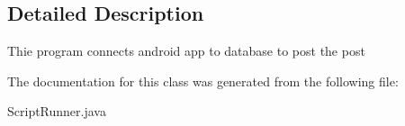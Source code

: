 \subsection{Detailed Description}
Thie program connects android app to database to post the post 

The documentation for this class was generated from the following file\+:\begin{DoxyCompactItemize}
\item 
Script\+Runner.\+java\end{DoxyCompactItemize}
